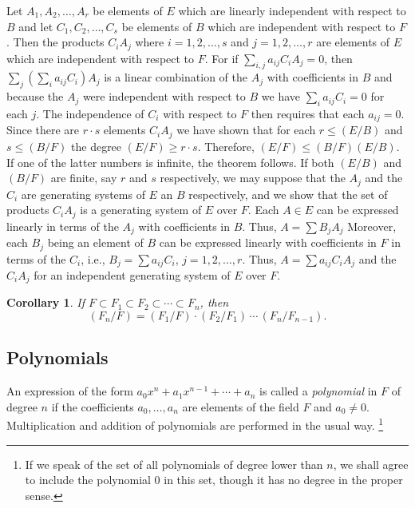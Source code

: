 \documentclass[11pt]{article}
\newtheorem*{coro*}{Corollary}
\theoremstyle{definition}
\begin{document}
Let $A_1, A_2, \ldots, A_r$ be elements of $E$ which are linearly independent with respect to $B$ and let $C_1, C_2, \ldots, C_s$ be elements of $B$ which are independent with respect to $F$.
Then the products $C_i A_j$ where $i = 1,2,\ldots, s$ and $j=1,2,\ldots,r$ are elements of $E$ which are independent with respect to $F$.
For if $\sum_{i,j} a_{ij} C_i A_j = 0$, then
$\sum_j (\sum_i a_{ij} C_i) A_j$ is a linear combination of the $A_j$ with coefficients in $B$ and because the $A_j$ were independent with respect to $B$ we have $\sum_i a_{ij} C_i = 0$ for each $j$.
The independence of $C_i$ with respect to $F$ then requires that each $a_{ij} = 0$.
Since there are $r \cdot s$ elements $C_i A_j$ we have shown that for each $r \leq (E/B)$ and $s \leq (B/F)$ the degree $(E/F) \geq r \cdot s$.
Therefore, $(E/F) \leq (B/F) (E/B)$.
If one of the latter numbers is infinite, the theorem follows.
If both $(E/B)$ and $(B/F)$ are finite, say $r$ and $s$ respectively, we may suppose that the $A_j$ and the $C_i$ are generating systems of $E$ an $B$ respectively, and we show that the set of products $C_i A_j$ is a generating system of $E$ over $F$.
Each $A \in E$ can be expressed linearly in terms of the $A_j$ with coefficients in $B$.
Thus, $A = \sum B_j A_j$
Moreover, each $B_j$ being an element of $B$ can be expressed linearly with coefficients in $F$ in terms of the $C_i$, i.e., $B_j = \sum a_{ij} C_i$, $j=1,2,\ldots,r$.
Thus, $A = \sum a_{ij} C_i A_j$ and the $C_iA_j$ for an independent generating system of $E$ over $F$.


\begin{coro*}
\label{coro:p22}
If $F \subset F_1 \subset F_2 \subset \cdots \subset F_n$, then 
\[
(F_n/F) = (F_1/F) \cdot (F_2/F_1) \, \cdots \, (F_n/F_{n-1}).
\]
\end{coro*}


\subsection{Polynomials}

An expression of the form $a_0 x^n + a_1 x^{n-1} + \cdots + a_n$ is called a \emph{polynomial} in $F$ of degree $n$ if the coefficients $a_0, \ldots, a_n$ are elements of the field $F$ and $a_0 \not= 0$.
Multiplication and addition of polynomials are performed in the usual way.%
\footnote{If we speak of the set of all polynomials of degree lower than $n$, we shall agree to include the polynomial $0$ in this set, though it has no degree in the proper sense.}
\end{document}
